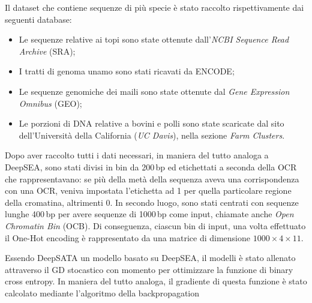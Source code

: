 Il dataset che contiene sequenze di più specie è stato raccolto rispettivamente dai seguenti database:
\begin{itemize}
    \item Le sequenze relative ai topi sono state ottenute dall'\textit{\acs{NCBI} Sequence Read Archive} (\acs{SRA});
    \item I tratti di genoma unamo sono stati ricavati da \acs{ENCODE};
    \item Le sequenze genomiche dei maili sono state ottenute dal \textit{Gene Expression Omnibus} (\acs{GEO});
    \item Le porzioni di \acs{DNA} relative a bovini e polli sono state scaricate dal sito dell'Università della California (\textsl{UC Davis}), nella sezione \textit{Farm Clusters}.
\end{itemize} 
% 
\noindent Dopo aver raccolto tutti i dati necessari, in maniera del tutto analoga a DeepSEA, sono stati divisi in bin da 200\,bp ed etichettati a seconda della \acs{OCR} che rappresentavano: se più della metà della sequenza aveva una corrispondenza con una \acs{OCR}, veniva impostata l'etichetta ad 1 per quella particolare regione della cromatina, altrimenti 0. In secondo luogo, sono stati centrati con sequenze lunghe 400\,bp per avere sequenze di 1000\,bp come input, chiamate anche \textit{Open Chromatin Bin} (\acs{OCB}). Di conseguenza, ciascun bin di input, una volta effettuato il One-Hot encoding è rappresentato da una matrice di dimensione $1000 \times 4 \times 11$.

Essendo DeepSATA un modello basato su DeepSEA, il modelli è stato allenato attraverso il \acs{GD} stocastico con momento per ottimizzare la funzione di binary cross entropy. In maniera del tutto analoga, il gradiente di questa funzione è stato calcolato mediante l'algoritmo della backpropagation

